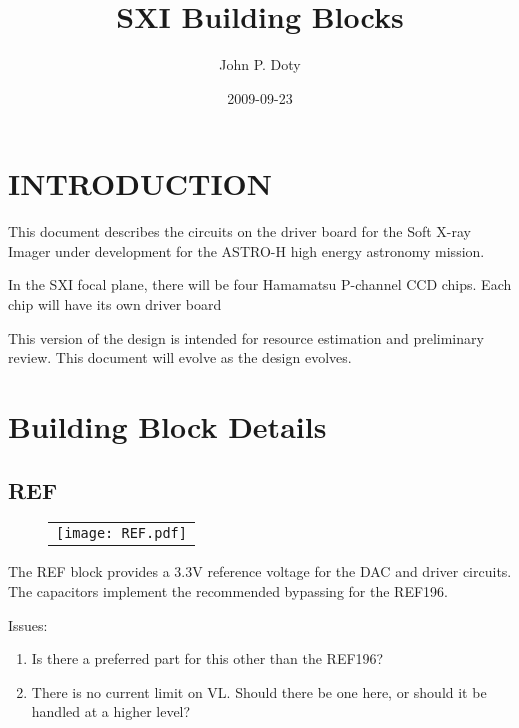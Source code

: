 \documentclass[a4paper,10pt]{report}
\author{John P. Doty}
\date{2009-09-23}
\title{SXI Building Blocks}
\begin{document}
\begin{titlepage}
\maketitle
\end{titlepage} 

\chapter{INTRODUCTION}
This document describes the circuits on the driver board for the Soft X-ray Imager under development for the ASTRO-H high energy astronomy mission.

In the SXI focal plane, there will be four Hamamatsu P-channel CCD chips. Each chip will have its own driver board

This version of the design is intended for resource estimation and preliminary review. This document will evolve as the design evolves.

\chapter{Building Block Details}
\section{REF}
   \begin{figure}
   \begin{center}
   \begin{tabular}{c}
   \texttt{[image: REF.pdf]}
   \end{tabular}
   \end{center}
   \end{figure}

The REF block provides a 3.3V reference voltage for the DAC and driver circuits. The capacitors implement the recommended bypassing for the REF196.

Issues:
\begin{enumerate}
\item
Is there a preferred part for this other than the REF196?
\item
There is no current limit on VL. Should there be one here, or should it be handled at a higher level?
\end{enumerate}
\end{document}
